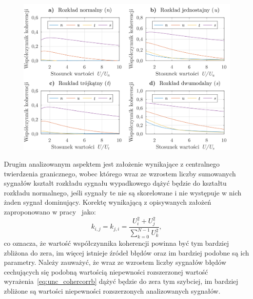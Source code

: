 \begin{figure}[htb!]
\begin{center}
\includegraphics{obrazki/shapes}
\end{center}
\end{figure}

Drugim analizowanym aspektem jest założenie wynikające z centralnego twierdzenia granicznego, wobec którego wraz ze wzrostem liczby sumowanych sygnałów kształt rozkładu sygnału wypadkowego dążyć będzie do kształtu rozkładu normalnego, jeśli sygnały te nie są skorelowane i nie występuje w nich żaden sygnał dominujący. Korektę wynikającą z opisywanych założeń zaproponowano w pracy~\cite{jakubiec_system} jako:
\begin{equation}
k_{i,j} = k_{j,i} = \frac{U_{i}^{2} + U_{j}^{2}}{\sum _{k = 0} ^{N-1} U_{k}^{2}} \label{eq:unc_cohercorrb},
\end{equation}
co oznacza, że wartość współczynnika koherencji powinna być tym bardziej zbliżona do zera, im więcej istnieje źródeł błędów oraz im bardziej podobne są ich parametry. Należy zauważyć, że wraz ze wzrostem liczby sygnałów błędów cechujących się podobną wartością niepewności rozszerzonej wartość wyrażenia~\eqref{eq:unc_cohercorrb} dążyć będzie do zera tym szybciej, im bardziej zbliżone są wartości niepewności rozszerzonych analizowanych sygnałów.

